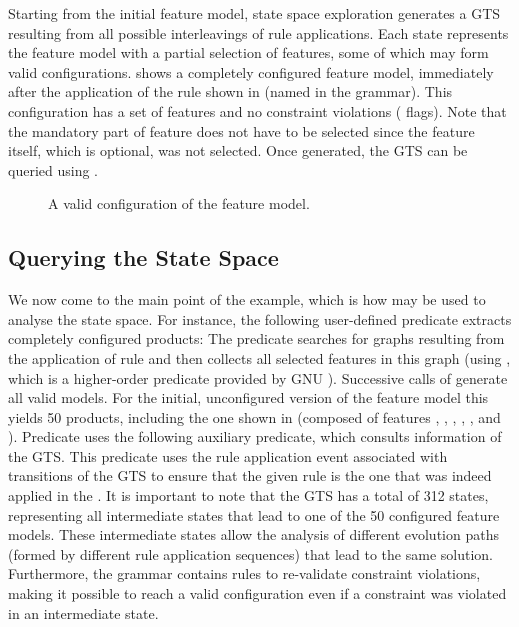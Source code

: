 Starting from the initial feature model, state space exploration generates a GTS
resulting from all possible interleavings of rule applications. Each state
represents the feature model with a partial selection of features, some of which
may form valid configurations.  shows a completely configured
feature model, immediately after the application of the rule shown in
 (named  in the grammar). This
configuration has a set of  features and no constraint violations
( flags). Note that the mandatory part of feature
 does not have to be selected since the feature itself, which
is optional, was not selected. Once generated, the GTS can be queried using
\Prolog.

\begin{figure}[t]
\centering
{}
\caption{A valid configuration of the feature model.}
\end{figure}

\subsection{Querying the State Space}

We now come to the main point of the example, which is how \Prolog may be used
to analyse the state space. For instance, the following user-defined predicate
extracts completely configured products:
%
%
The predicate searches for graphs resulting from the application of rule
 and then collects all selected features in this
graph (using , which is a higher-order predicate provided by GNU
\Prolog). Successive calls of  generate all valid models. For the
initial, unconfigured version of the feature model this yields 50 products,
including the one shown in  (composed of features
, , , ,
, and ). Predicate  uses the following
auxiliary predicate, which consults information of the GTS.
%
%
This predicate uses the rule application event associated with transitions of
the GTS to ensure that the given rule is the one that was indeed applied in the
.
%
It is important to note that the GTS has a total of 312 states, representing all
intermediate states that lead to one of the 50 configured feature models. These
intermediate states allow the analysis of different evolution paths (formed by
different rule application sequences) that lead to the same solution.
Furthermore, the grammar contains rules to re-validate constraint violations,
making it possible to reach a valid configuration even if a constraint was
violated in an intermediate state.

